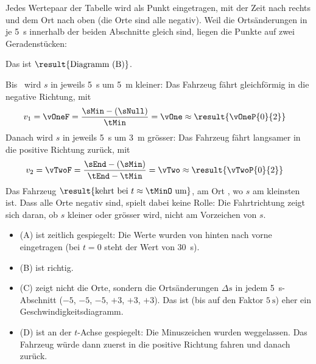 \begin{abcliste}
\abc Jedes Wertepaar der Tabelle wird als Punkt eingetragen, mit der Zeit nach rechts und dem Ort nach oben (die Orte sind alle negativ). Weil die Ortsänderungen in je \SI{5}{\second} innerhalb der beiden Abschnitte gleich sind, liegen die Punkte auf zwei Geradenstücken:
\begin{center}
\end{center}
Das ist $\result{\text{Diagramm (B)}}$.

\abc Bis \tMinO\ wird $s$ in jeweils \SI{5}{\second} um \SI{5}{\meter} kleiner: Das Fahrzeug fährt gleichförmig in die negative Richtung, mit
\begin{align}
 v_1 &= \vOneF = \frac{\sMin-\left(\sNull\right)}{\tMin} = \vOne \approx \result{\vOneP{0}{2}}
\end{align}
Danach wird $s$ in jeweils \SI{5}{\second} um \SI{3}{\meter} grösser: Das Fahrzeug fährt langsamer in die positive Richtung zurück, mit
\begin{align}
 v_2 &= \vTwoF = \frac{\sEnd-\left(\sMin\right)}{\tEnd-\tMin} = \vTwo \approx \result{\vTwoP{0}{2}}
\end{align}
Das Fahrzeug $\result{\text{kehrt bei } t\approx\tMinO \text{ um}}$, am Ort \sMinO, wo $s$ am kleinsten ist. Dass alle Orte negativ sind, spielt dabei keine Rolle: Die Fahrtrichtung zeigt sich daran, ob $s$ kleiner oder grösser wird, nicht am Vorzeichen von $s$.

\abc
\begin{itemize}
\item (A) ist zeitlich gespiegelt: Die Werte wurden von hinten nach vorne eingetragen (bei $t = 0$ steht der Wert von \SI{30}{\second}).
\item (B) ist richtig.
\item (C) zeigt nicht die Orte, sondern die Ortsänderungen $\Delta s$ in jedem \SI{5}{\second}-Abschnitt ($-5$, $-5$, $-5$, $+3$, $+3$, $+3$). Das ist (bis auf den Faktor $\SI{5}{\second}$) eher ein Geschwindigkeitsdiagramm.
\item (D) ist an der $t$-Achse gespiegelt: Die Minuszeichen wurden weggelassen. Das Fahrzeug würde dann zuerst in die positive Richtung fahren und danach zurück.
\end{itemize}
\end{abcliste}
